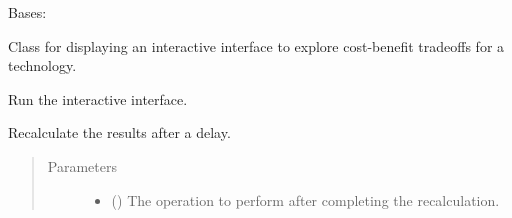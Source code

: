\documentclass[letterpaper,10pt,english]{sphinxmanual}
\begin{document}
\begin{fulllineitems}
\label{\detokenize{doc-src/tyche:tyche.DecisionGUI.DecisionWindow}}
Bases: 

Class for displaying an interactive interface to explore cost-benefit tradeoffs for a technology.

\begin{fulllineitems}
\label{\detokenize{doc-src/tyche:tyche.DecisionGUI.DecisionWindow.create_figure}}
\end{fulllineitems}


\begin{fulllineitems}
\label{\detokenize{doc-src/tyche:tyche.DecisionGUI.DecisionWindow.mainloop}}
Run the interactive interface.

\end{fulllineitems}


\begin{fulllineitems}
\label{\detokenize{doc-src/tyche:tyche.DecisionGUI.DecisionWindow.reevaluate}}
Recalculate the results after a delay.
\begin{quote}\begin{description}
\item[{Parameters}] \leavevmode\begin{itemize}
\item {} 
 () \textendash{} The operation to perform after completing the recalculation.


\end{itemize}
\end{description}
\end{quote}
\end{fulllineitems}
\end{fulllineitems}
\end{document}
